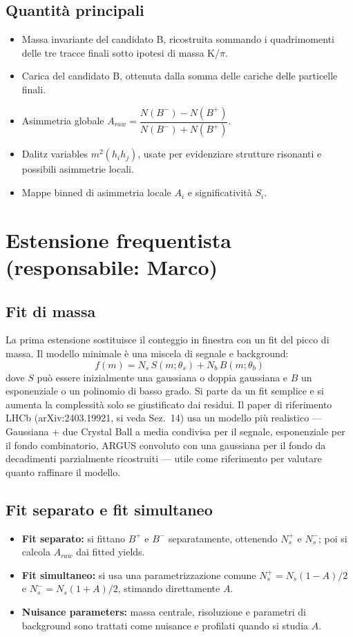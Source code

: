 \documentclass[11pt,a4paper]{article}
\begin{document}
\subsection*{Quantità principali}
\begin{itemize}[leftmargin=1.4em]
    \item Massa invariante del candidato B, ricostruita sommando i quadrimomenti delle tre tracce finali sotto ipotesi di massa K/$\pi$.
    \item Carica del candidato B, ottenuta dalla somma delle cariche delle particelle finali.
    \item Asimmetria globale $A_{raw} = \dfrac{N(B^-) - N(B^+)}{N(B^-) + N(B^+)}$.
    \item Dalitz variables $m^2(h_i h_j)$, usate per evidenziare strutture risonanti e possibili asimmetrie locali.
    \item Mappe binned di asimmetria locale $A_i$ e significatività $S_i$.
\end{itemize}

\section{Estensione frequentista \textnormal{\small(responsabile: Marco)}}

\subsection*{Fit di massa}
La prima estensione sostituisce il conteggio in finestra con un fit del picco di massa. Il modello minimale è una miscela di segnale e background:
\[
f(m) = N_s\, S(m;\theta_s) + N_b\, B(m;\theta_b)
\]
dove $S$ può essere inizialmente una gaussiana o doppia gaussiana e $B$ un esponenziale o un polinomio di basso grado. Si parte da un fit semplice e si aumenta la complessità solo se giustificato dai residui. Il paper di riferimento LHCb (arXiv:2403.19921, si veda Sez.~14) usa un modello più realistico --- Gaussiana + due Crystal Ball a media condivisa per il segnale, esponenziale per il fondo combinatorio, ARGUS convoluto con una gaussiana per il fondo da decadimenti parzialmente ricostruiti --- utile come riferimento per valutare quanto raffinare il modello.

\subsection*{Fit separato e fit simultaneo}
\begin{itemize}[leftmargin=1.4em]
    \item \textbf{Fit separato:} si fittano $B^+$ e $B^-$ separatamente, ottenendo $N_s^+$ e $N_s^-$; poi si calcola $A_{raw}$ dai fitted yields.
    \item \textbf{Fit simultaneo:} si usa una parametrizzazione comune $N_s^+ = N_s(1-A)/2$ e $N_s^- = N_s(1+A)/2$, stimando direttamente $A$.
    \item \textbf{Nuisance parameters:} massa centrale, risoluzione e parametri di background sono trattati come nuisance e profilati quando si studia $A$.
\end{itemize}
\end{document}

